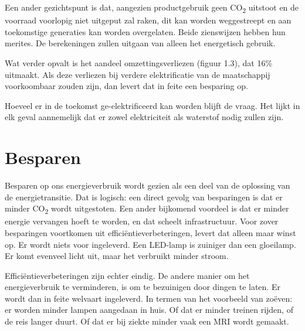\documentclass[
  11pt,
  a4paper,
]{book}
\begin{document}
Een ander gezichtspunt is dat, aangezien productgebruik geen CO\textsubscript{2} uitstoot en de voorraad voorlopig niet uitgeput zal raken, dit kan worden weggestreept en aan toekomstige generaties kan worden overgelaten. Beide zienswijzen hebben hun merites. De berekeningen zullen uitgaan van alleen het energetisch gebruik.

Wat verder opvalt is het aandeel omzettingsverliezen (figuur 1.3), dat 16\% uitmaakt. Als deze verliezen bij verdere elektrificatie van de maatschappij voorkoombaar zouden zijn, dan levert dat in feite een besparing op.

Hoeveel er in de toekomst ge-elektrificeerd kan worden blijft de vraag. Het lijkt in elk geval aannemelijk dat er zowel elektriciteit als waterstof nodig zullen zijn.

\hypertarget{besparen}{%
\section{Besparen}\label{besparen}}

Besparen op ons energieverbruik wordt gezien als een deel van de oplossing van de energietransitie. Dat is logisch: een direct gevolg van besparingen is dat er minder CO\textsubscript{2} wordt uitgestoten. Een ander bijkomend voordeel is dat er minder energie vervangen hoeft te worden, en dat scheelt infrastructuur. Voor zover besparingen voortkomen uit efficiëntieverbeteringen, levert dat alleen maar winst op. Er wordt niets voor ingeleverd. Een LED-lamp is zuiniger dan een gloeilamp. Er komt evenveel licht uit, maar het verbruikt minder stroom.

Efficiëntieverbeteringen zijn echter eindig. De andere manier om het energieverbruik te verminderen, is om te bezuinigen door dingen te laten. Er wordt dan in feite welvaart ingeleverd. In termen van het voorbeeld van zoëven: er worden minder lampen aangedaan in huis. Of dat er minder treinen rijden, of de reis langer duurt. Of dat er bij ziekte minder vaak een MRI wordt gemaakt.
\end{document}
